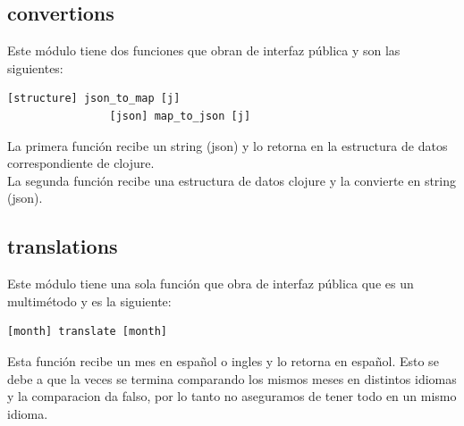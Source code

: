 \documentclass[a4paper, 12pt]{article}
\begin{document}
		\subsection{convertions}
			Este módulo tiene dos funciones que obran de interfaz pública y son las siguientes:
			\begin{lstlisting}[frame=tb, caption=firmas de la interfaz pública, label=zebra, tabsize=1]
				[structure] json_to_map [j]
				[json] map_to_json [j]
			\end{lstlisting}
			La primera función recibe un string (json) y lo retorna en la estructura de datos correspondiente de clojure.\\
			La segunda función recibe una estructura de datos clojure y la convierte en string (json).\\

		\newpage
		\subsection{translations}
			Este módulo tiene una sola función que obra de interfaz pública que es un multimétodo y es la siguiente:
			\begin{lstlisting}[frame=tb, caption=firmas de la interfaz pública, label=zebra, tabsize=1]
				[month] translate [month]
			\end{lstlisting}
			Esta función recibe un mes en español o ingles y lo retorna en español. Esto se debe a que la veces se termina 				comparando los mismos meses en distintos idiomas y la comparacion da falso, por lo tanto  no aseguramos de tener todo 				en un mismo idioma.
\end{document}

